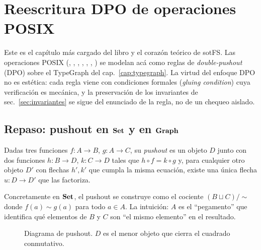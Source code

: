 \chapter{Reescritura DPO de operaciones POSIX}
\label{cap:dpo}

Este es el capítulo más cargado del libro y el corazón teórico de sotFS.
Las operaciones POSIX (\opcreate, \opmkdir, \opunlink, \oprename,
\oplink, \oprmdir, \opwrite) se modelan acá como reglas de
\emph{double-pushout} (DPO) sobre el TypeGraph del cap.~\ref{cap:typegraph}.
La virtud del enfoque DPO no es estética: cada regla viene con
condiciones formales (\emph{gluing condition}) cuya verificación es
mecánica, y la preservación de los invariantes de
sec.~\ref{sec:invariantes} se sigue del enunciado de la regla, no de un
chequeo aislado.

\section{Repaso: pushout en \texorpdfstring{$\mathbf{Set}$}{Set} y en \texorpdfstring{$\mathbf{Graph}$}{Graph}}

\begin{defn}
\label{def:pushout-set}
Dadas tres funciones $f: A \to B$, $g: A \to C$, su \emph{pushout} es un
objeto $D$ junto con dos funciones $h: B \to D$, $k: C \to D$ tales que
$h \circ f = k \circ g$ y, para cualquier otro objeto $D'$ con flechas
$h', k'$ que cumpla la misma ecuación, existe una única flecha
$u: D \to D'$ que las factoriza.
\end{defn}

Concretamente en $\mathbf{Set}$, el pushout se construye como el cociente
$(B \sqcup C)/\sim$ donde $f(a) \sim g(a)$ para todo $a \in A$. La
intuición: $A$ es el ``pegamento'' que identifica qué elementos de $B$ y
$C$ son ``el mismo elemento'' en el resultado.

\begin{figure}[h]
\centering
{}
\caption{Diagrama de pushout. $D$ es el menor objeto que cierra el
cuadrado conmutativo.}
\label{fig:pushout-set}
\end{figure}

